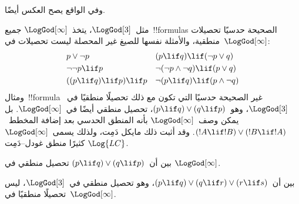 \documentclass[../../../include/open-logic-section]{subfiles}
\begin{document}
وفي الواقع يصح العكس أيضًا.

مثل~$\LogGod[3]$، يتخذ~$\LogGod[\infty]$ جميع~!!{formula}s الصحيحة
حدسيًا تحصيلات منطقية، والأمثلة نفسها للصيغ غير المحصلة ليست تحصيلات
في~$\LogGod[\infty]$:
\begin{align*}
  & p \lor \lnot p && (p \lif q) \lif (\lnot p \lor q) \\
  & \lnot\lnot p \lif p && \lnot(\lnot p \land \lnot q) \lif (p \lor q) \\
  & ((p \lif q) \lif p) \lif p && \lnot(p \lif q) \lif (p \land \lnot q)
\end{align*}
ومثال~!!{formula} غير الصحيحة حدسيًا التي تكون مع ذلك تحصيلًا منطقيًا
في~$\LogGod[3]$، وهو~$(p \lif q) \lor (q \lif p)$، تحصيل منطقي أيضًا
في~$\LogGod[\infty]$. بل يمكن وصف~$\LogGod[\infty]$ بأنه المنطق
الحدسي بعد إضافة المخطط~$(!A \lif !B) \lor (!B \lif !A)$. وقد أثبت
ذلك مايكل دَمِت، ولذلك يسمى~$\LogGod[\infty]$ كثيرًا منطق غودل--دَمِت
$\Log{LC}$.

\begin{prob}
  بين أن~$(p \lif q) \lor (q \lif p)$ تحصيل منطقي في
  $\LogGod[\infty]$.
\end{prob}

\begin{prob}
  بين أن~$(p \lif q) \lor (q \lif r) \lor (r \lif s)$، وهو تحصيل
  منطقي في~$\LogGod[3]$، ليس تحصيلًا منطقيًا في~$\LogGod[\infty]$.
\end{prob}
\end{document}
